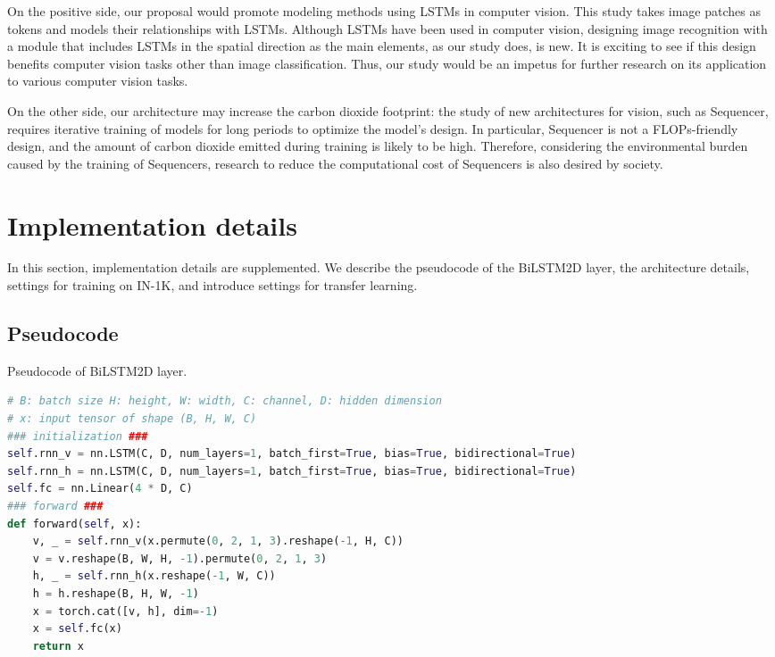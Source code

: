 \documentclass{article}
\begin{document}
On the positive side, our proposal would promote modeling methods using LSTMs in computer vision. This study takes image patches as tokens and models their relationships with LSTMs. Although LSTMs have been used in computer vision, designing image recognition with a module that includes LSTMs in the spatial direction as the main elements, as our study does, is new. It is exciting to see if this design benefits computer vision tasks other than image classification. Thus, our study would be an impetus for further research on its application to various computer vision tasks.

On the other side, our architecture may increase the carbon dioxide footprint: the study of new architectures for vision, such as Sequencer, requires iterative training of models for long periods to optimize the model's design. In particular, Sequencer is not a FLOPs-friendly design, and the amount of carbon dioxide emitted during training is likely to be high. Therefore, considering the environmental burden caused by the training of Sequencers, research to reduce the computational cost of Sequencers is also desired by society.

\section{Implementation details}
\label{sec:impl_details}
In this section, implementation details are supplemented. We describe the pseudocode of the BiLSTM2D layer, the architecture details, settings for training on IN-1K, and introduce settings for transfer learning.

\subsection{Pseudocode}
\label{subsec:pseudocode}
\begin{algorithm}[h]
\caption{Pseudocode of BiLSTM2D layer.}
\label{alg:lstm2d}
\begin{lstlisting}[language=python]
# B: batch size H: height, W: width, C: channel, D: hidden dimension
# x: input tensor of shape (B, H, W, C)
### initialization ###
self.rnn_v = nn.LSTM(C, D, num_layers=1, batch_first=True, bias=True, bidirectional=True)
self.rnn_h = nn.LSTM(C, D, num_layers=1, batch_first=True, bias=True, bidirectional=True)
self.fc = nn.Linear(4 * D, C)
### forward ###
def forward(self, x):
    v, _ = self.rnn_v(x.permute(0, 2, 1, 3).reshape(-1, H, C))
    v = v.reshape(B, W, H, -1).permute(0, 2, 1, 3)
    h, _ = self.rnn_h(x.reshape(-1, W, C))
    h = h.reshape(B, H, W, -1)
    x = torch.cat([v, h], dim=-1)
    x = self.fc(x)
    return x
\end{lstlisting}
\end{algorithm}
\end{document}
